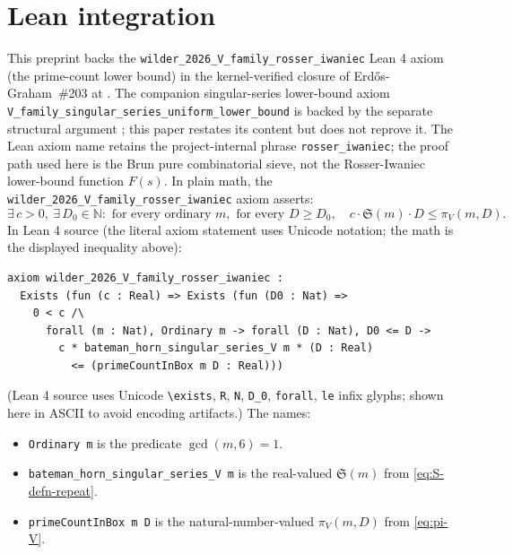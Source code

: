 \documentclass[11pt,a4paper]{article}
\theoremstyle{plain}
\theoremstyle{definition}
\theoremstyle{remark}
\begin{document}










\section{Lean integration}\label{sec:lean}

This preprint backs the \texttt{wilder\_2026\_V\_family\_rosser\_iwaniec}
Lean 4 axiom (the prime-count lower bound) in the kernel-verified
closure of Erd\H{o}s-Graham~\#203 at \cite{WilderEG203Lean2026}. The
companion singular-series lower-bound axiom
\texttt{V\_family\_singular\_series\_uniform\_lower\_bound} is backed
by the separate structural argument \cite{WilderChain103}; this
paper restates its content but does not reprove it. The Lean axiom
name retains the project-internal phrase \texttt{rosser\_iwaniec};
the proof path used here is the Brun pure combinatorial sieve, not
the Rosser-Iwaniec lower-bound function $F(s)$. In plain math, the
\texttt{wilder\_2026\_V\_family\_rosser\_iwaniec} axiom asserts:
\[
  \exists\, c > 0,\ \exists\, D_{0} \in \mathbb{N} : \text{ for every
  ordinary } m, \text{ for every } D \geq D_{0},
  \quad c \cdot \mathfrak{S}(m) \cdot D \leq \pi_{V}(m, D).
\]
In Lean 4 source (the literal axiom statement uses Unicode
notation; the math is the displayed inequality above):

\begin{verbatim}
axiom wilder_2026_V_family_rosser_iwaniec :
  Exists (fun (c : Real) => Exists (fun (D0 : Nat) =>
    0 < c /\
      forall (m : Nat), Ordinary m -> forall (D : Nat), D0 <= D ->
        c * bateman_horn_singular_series_V m * (D : Real)
          <= (primeCountInBox m D : Real)))
\end{verbatim}

(Lean 4 source uses Unicode \texttt{\textbackslash exists}, \texttt{R},
\texttt{N}, \texttt{D\_0}, \texttt{forall}, \texttt{le} infix glyphs;
shown here in ASCII to avoid encoding artifacts.) The names:
\begin{itemize}
  \item \texttt{Ordinary m} is the predicate $\gcd(m, 6) = 1$.
  \item \texttt{bateman\_horn\_singular\_series\_V m} is the
    real-valued $\mathfrak{S}(m)$ from \cref{eq:S-defn-repeat}.
  \item \texttt{primeCountInBox m D} is the natural-number-valued
    $\pi_{V}(m, D)$ from \cref{eq:pi-V}.
\end{itemize}
\end{document}
